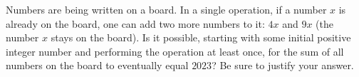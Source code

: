 Numbers are being written on a board. In a single operation, if a number $x$ is already on the board, one can add two more numbers to it: $4x$ and $9x$ (the number $x$ stays on the board). Is it possible, starting with some initial positive integer number and performing the operation at least once, for the sum of all numbers on the board to eventually equal $2023$? Be sure to justify your answer.
